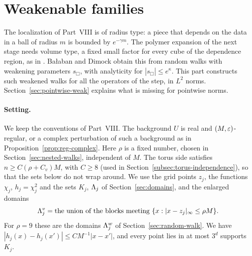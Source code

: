 \section{Weakenable families}\label{sec:weakenable}

The localization of Part~VIII is of radius type: a piece that depends on the data in a ball of radius $m$ is bounded by $e^{-\gamma m}$. The polymer expansion of the next stage needs volume type, a fixed small factor for every cube of the dependence region, as in \cite[(116)--(122)]{DimockI}. Ba\l aban and Dimock obtain this from random walks with weakening parameters $s_\Box$, with analyticity for $|s_\Box|\le e^{\kappa}$. This part constructs such weakened walks for all the operators of the step, in $L^2$ norms. Section~\ref{sec:pointwise-weak} explains what is missing for pointwise norms.

\paragraph{Setting.} We keep the conventions of Part~VIII. The background $U$ is real and $(M,\varepsilon)$-regular, or a complex perturbation of such a background as in Proposition~\ref{prop:reg-complex}. Here $\rho$ is a fixed number, chosen in Section~\ref{sec:nested-walks}, independent of $M$. The torus side satisfies $n\ge C(\rho+C_v)M$, with $C\ge8$ (used in Section~\ref{subsec:torus-independence}), so that the sets below do not wrap around. We use the grid points $z_j$, the functions $\chi_j$, $h_j=\chi_j^2$ and the sets $K_j$, $\Lambda_j$ of Section~\ref{sec:domains}, and the enlarged domains
\[
\Lambda^v_j=\text{the union of the blocks meeting }\{x:|x-z_j|_\infty\le\rho M\}.
\]
For $\rho=9$ these are the domains $\Lambda^w_j$ of Section~\ref{sec:random-walk}. We have $|h_j(x)-h_j(x')|\le CM^{-1}|x-x'|$, and every point lies in at most $3^d$ supports $K_j$.

